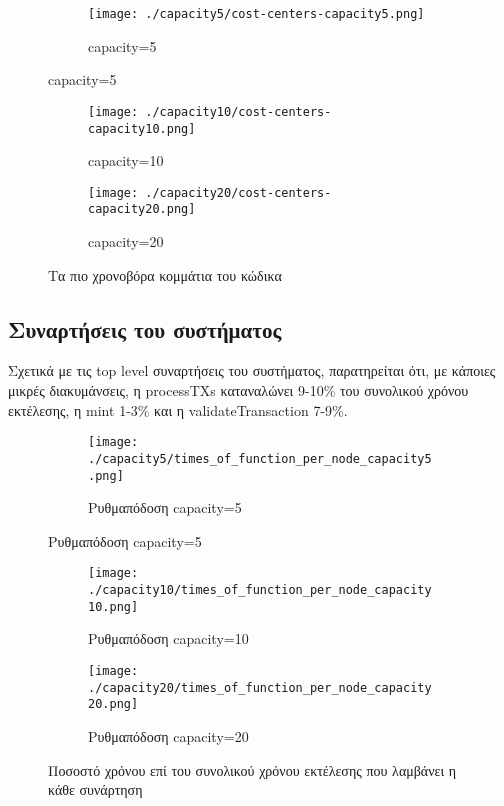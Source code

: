 \documentclass{article}
\newcommand{\eng}[1]{\foreignlanguage{english}{#1}} %
\begin{document}
\graphicspath{{../experiments/profiled\_outputs/throughput_proper/}}

\begin{figure}[ht]
    \centering
    \begin{subfigure}{\textwidth}
        \texttt{[image: ./capacity5/cost-centers-capacity5.png]}
        \caption{\eng{capacity=5}}
    \end{subfigure}
\end{figure}
\begin{figure}[ht]
    \ContinuedFloat
    \begin{subfigure}{\textwidth}
        \texttt{[image: ./capacity10/cost-centers-capacity10.png]}
        \caption{\eng{capacity=10}}
    \end{subfigure}
    \begin{subfigure}{\textwidth}
        \texttt{[image: ./capacity20/cost-centers-capacity20.png]}
        \caption{\eng{capacity=20}}
    \end{subfigure}
    \caption{Τα πιο χρονοβόρα κομμάτια του κώδικα}
    \label{fig:throughput-cost-centers}
\end{figure}
\FloatBarrier

\subsection{Συναρτήσεις του συστήματος}

Σχετικά με τις \eng{top level} συναρτήσεις του συστήματος, παρατηρείται ότι, με
κάποιες μικρές διακυμάνσεις, η \eng{processTXs} καταναλώνει 9-10\% του
συνολικού χρόνου εκτέλεσης, η \eng{mint} 1-3\% και η \eng{validateTransaction}
7-9\%.

\begin{figure}[ht]
    \centering
    \begin{subfigure}{\textwidth}
        \texttt{[image: ./capacity5/times\_of\_function\_per\_node\_capacity5.png]}
        \caption{Ρυθμαπόδοση \eng{capacity=5}}
    \end{subfigure}
\end{figure}
\begin{figure}[ht]
    \ContinuedFloat
    \begin{subfigure}{\textwidth}
        \texttt{[image: ./capacity10/times\_of\_function\_per\_node\_capacity10.png]}
        \caption{Ρυθμαπόδοση \eng{capacity=10}}
    \end{subfigure}
    \begin{subfigure}{\textwidth}
        \texttt{[image: ./capacity20/times\_of\_function\_per\_node\_capacity20.png]}
        \caption{Ρυθμαπόδοση \eng{capacity=20}}
    \end{subfigure}
    \caption{Ποσοστό χρόνου επί του συνολικού χρόνου εκτέλεσης που λαμβάνει η κάθε συνάρτηση}
\end{figure}
\FloatBarrier
\end{document}
